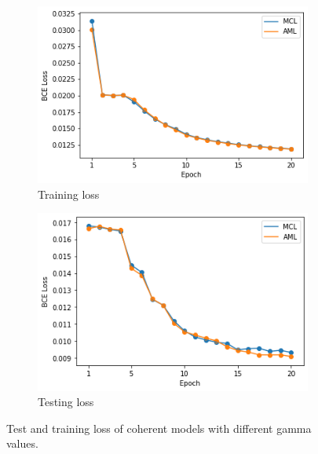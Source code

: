 \begin{figure}
  \begin{subfigure}[t]{.5\textwidth}
    \centering
    \includegraphics[width=\textwidth]{figures/supervised_approach/mcl_train_loss.png}
    \caption{Training loss}
    \label{fig:mcl_train_loss}
  \end{subfigure}
   \begin{subfigure}[t]{.5\textwidth}
    \centering
    \includegraphics[width=\textwidth]{figures/supervised_approach/mcl_test_loss.png}
    \caption{Testing loss}
    \label{fig:mcl_test_loss}
  \end{subfigure}
  \caption{Test and training loss of coherent models with different gamma values.}
  \label{fig:mcl_train}
\end{figure}

